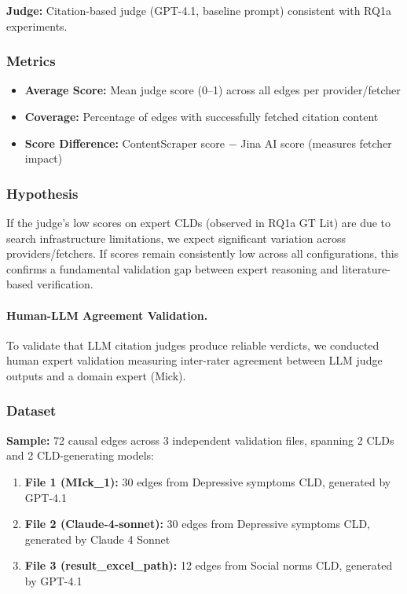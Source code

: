 \textbf{Judge:} Citation-based judge (GPT-4.1, baseline prompt) consistent with RQ1a experiments.

\subsubsection{Metrics}

\begin{itemize}[noitemsep]
    \item \textbf{Average Score:} Mean judge score (0--1) across all edges per provider/fetcher
    \item \textbf{Coverage:} Percentage of edges with successfully fetched citation content
    \item \textbf{Score Difference:} ContentScraper score $-$ Jina AI score (measures fetcher impact)
\end{itemize}

\subsubsection{Hypothesis}

If the judge's low scores on expert CLDs (observed in RQ1a GT Lit) are due to search infrastructure limitations, we expect significant variation across providers/fetchers. If scores remain consistently low across all configurations, this confirms a fundamental validation gap between expert reasoning and literature-based verification.

\paragraph{Human-LLM Agreement Validation.}
To validate that LLM citation judges produce reliable verdicts, we conducted human expert validation measuring inter-rater agreement between LLM judge outputs and a domain expert (Mick).

\subsubsection{Dataset}

\textbf{Sample:} 72 causal edges across 3 independent validation files, spanning 2 CLDs and 2 CLD-generating models:
\begin{enumerate}[noitemsep]
    \item \textbf{File 1 (MIck\_1):} 30 edges from Depressive symptoms CLD, generated by GPT-4.1
    \item \textbf{File 2 (Claude-4-sonnet):} 30 edges from Depressive symptoms CLD, generated by Claude 4 Sonnet
    \item \textbf{File 3 (result\_excel\_path):} 12 edges from Social norms CLD, generated by GPT-4.1
\end{enumerate}

